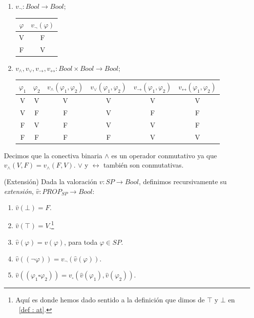 \begin{enumerate}
\item $v_{\neg}: Bool \rightarrow Bool$;
\begin{table}[H]
\begin{center}
\begin{tabular}{|c|c|}
\hline
$\varphi$ & $v_{\neg}(\varphi)$ \\
\hline \hline
V & F \\ \hline
F & V \\ \hline
\end{tabular}
\end{center}
\end{table}
\item $v_\land, v_\lor, v_\rightarrow, v_\leftrightarrow: Bool \times Bool \rightarrow Bool$;
\begin{table}[H]
\begin{center}
\begin{tabular}{|c|c|c|c|c|c|}
\hline
$\varphi_1$ & $\varphi_2$ & $v_{\land}(\varphi_1, \varphi_2)$ & $v_{\lor}(\varphi_1, \varphi_2)$ & $v_{\rightarrow}(\varphi_1, \varphi_2)$ & $v_{\leftrightarrow}(\varphi_1, \varphi_2)$ \\
\hline \hline
V & V & V & V & V & V\\ \hline
V & F & F & V & F & F\\ \hline
F & V & F & V & V & F\\ \hline
F & F & F & F & V & V\\ \hline
\end{tabular}
\end{center}
\end{table}
\end{enumerate}
Decimos que la conectiva binaria $\land$ es un operador conmutativo ya que $v_\land(V,F)=v_\land(F,V)$. $\lor$ y $\leftrightarrow$ también son conmutativas.
\begin{definition}\label{def : ext}(Extensión) Dada la valoración $v: SP \rightarrow Bool$, definimos recursivamente su \textit{extensión}, $\hat{v}: PROP_{SP} \rightarrow Bool$:
\begin{enumerate}
    \item $\hat{v}(\bot) = F$.
    \item $\hat{v}(\top) = V$.\footnote{Aquí es donde hemos dado sentido a la definición que dimos de $\top$ y $\bot$ en ~\ref{def : at}.}
    \item $\hat{v}(\varphi) = v(\varphi)$, para toda $\varphi \in SP$.
    \item $\hat{v}((\neg \varphi)) = v_{\neg}(\hat{v}(\varphi))$.
    \item $\hat{v}((\varphi_1 \square \varphi_2)) = v_{\square}(\hat{v}(\varphi_1), \hat{v}(\varphi_2))$.
\end{enumerate}
\end{definition}


